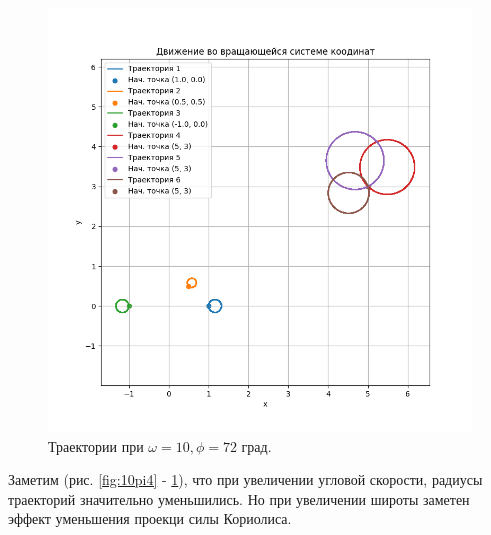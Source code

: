 \begin{figure}[h]  %
	\centering
	\includegraphics[height=0.7\textwidth]{imgs/10pi2.5.png}  %
	\caption{Траектории при \(\omega = 10, \phi = 72\) град.}  %
	\label{fig:10pi2.5}  %
\end{figure}
\newpage

Заметим (рис. \ref{fig:10pi4} - \ref{fig:10pi2.5}), что при увеличении угловой скорости, радиусы траекторий значительно уменьшились. Но при увеличении широты заметен эффект уменьшения проекци силы Кориолиса.


